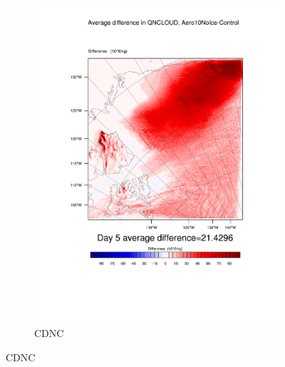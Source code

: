 \begin{figure}[hb]
\begin{subfigure}{0.40\textwidth}
		\includegraphics[width=\textwidth]{results/aero10ni/diff_Aero10NoIce_QNCLOUD_Day5.pdf}
		\caption{CDNC}
		\label{subfig:CDNCr4Day5}
	\end{subfigure}
	

\end{figure}
